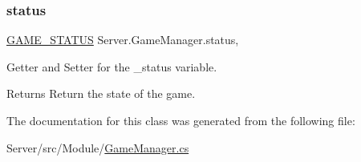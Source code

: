 \subsubsection{\texorpdfstring{status}{status}}
{\footnotesize\ttfamily \hyperlink{namespace_server_a2b496a25969b5c46d373f7079fac645f}{G\+A\+M\+E\+\_\+\+S\+T\+A\+T\+US} Server.\+Game\+Manager.\+status\hspace{0.3cm}{\ttfamily [get]}, {\ttfamily [set]}}

Getter and Setter for the \+\_\+status variable. \begin{DoxyReturn}{Returns}
Return the state of the game. 
\end{DoxyReturn}


The documentation for this class was generated from the following file\+:\begin{DoxyCompactItemize}
\item 
Server/src/\+Module/\hyperlink{_game_manager_8cs}{Game\+Manager.\+cs}\end{DoxyCompactItemize}
